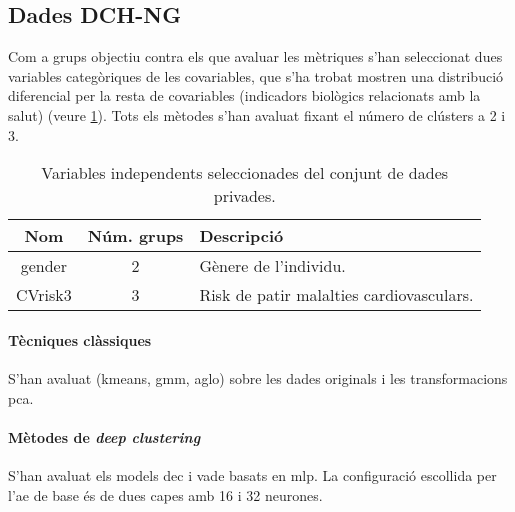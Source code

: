\documentclass[CAT,BIB]{TFUOC}%
\begin{document}
        \subsection{Dades DCH-NG}
        \label{s:dades_privades}

            Com a grups objectiu contra els que avaluar les mètriques
            s'han seleccionat dues variables categòriques de les covariables,
            que s'ha trobat mostren una distribució diferencial per la resta de covariables
            (indicadors biològics relacionats amb la salut) (veure \cref{t:dadespriv_vars}).
            Tots els mètodes s'han avaluat fixant el número de clústers a 2 i 3.

            \begin{table}[h]
                \small
                \centering
                \begin{tabular}{@{}ccl@{}}
                    \toprule
                    \textbf{Nom} & \textbf{Núm. grups} & \textbf{Descripció}    \\ \midrule
                    gender       & 2 & Gènere de l'individu.                    \\
                    CVrisk3      & 3 & Risk de patir malalties cardiovasculars. \\
                    \bottomrule
                \end{tabular}
                \caption[Dades DCH-NG: covariables seleccionades]{Variables independents seleccionades del conjunt de dades \gls{privades}.}
                \label{t:dadespriv_vars}
            \end{table}

            \paragraph{Tècniques clàssiques}
                S'han avaluat (\gls{kmeans}, \gls{gmm}, \gls{aglo})
                sobre les dades originals i les transformacions \gls{pca}.

            \paragraph{Mètodes de \textit{deep clustering}}
                S'han avaluat els models \gls{dec} i \gls{vade}
                basats en \gls{mlp}.
                La configuració escollida per l'\gls{ae} de base
                és de dues capes amb 16 i 32 neurones.
\end{document}

